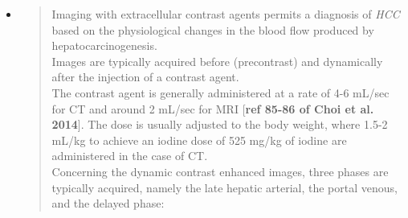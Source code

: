 \documentclass[]{article}
\begin{document}
\begin{itemize}
\item
  \begin{quote}
  Imaging with extracellular contrast agents permits a diagnosis of
  \emph{HCC} based on the physiological changes in the blood flow
  produced by hepatocarcinogenesis.\\
  Images are typically acquired before (precontrast) and dynamically
  after the injection of a contrast agent.\\
  The contrast agent is generally administered at a rate of 4-6 mL/sec
  for CT and around 2 mL/sec for MRI {[}\textbf{ref 85-86 of Choi et al.
  2014}{]}. The dose is usually adjusted to the body weight, where 1.5-2
  mL/kg to achieve an iodine dose of 525 mg/kg of iodine are
  administered in the case of CT.\\
  Concerning the dynamic contrast enhanced images, three phases are
  typically acquired, namely the late hepatic arterial, the portal
  venous, and the delayed phase:
  \end{quote}


\end{itemize}
\end{document}

